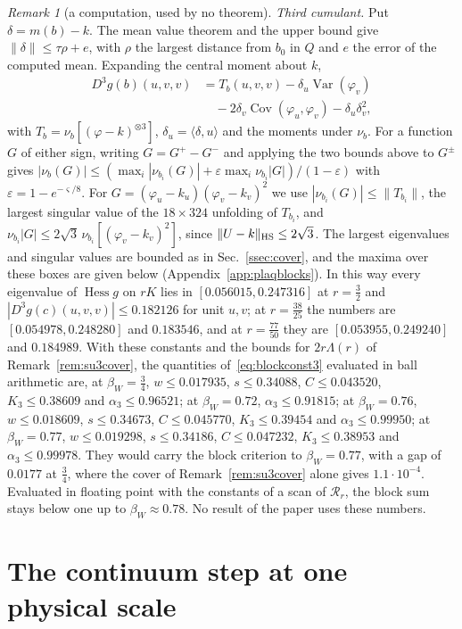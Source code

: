 \documentclass[aps,prd,twocolumn,superscriptaddress,nofootinbib,longbibliography,floatfix,amsmath,amssymb,10pt]{revtex4-2}
\theoremstyle{definition}
\theoremstyle{remark}
\newtheorem{remark}[theorem]{Remark}
\newcommand{\Hess}{\operatorname{Hess}}
\newcommand{\Cov}{\operatorname{Cov}}
\newcommand{\Var}{\operatorname{Var}}
\newcommand{\ip}[2]{\langle #1,#2\rangle}
\begin{document}
\begin{remark}[a computation, used by no theorem]
\emph{Third cumulant.} Put $\delta=m(b)-k$. The mean value theorem and the
upper bound give $\|\delta\|\le\tau\rho+e$, with $\rho$ the largest distance
from $b_0$ in $Q$ and $e$ the error of the computed mean. Expanding the
central moment about $k$,
\[
\begin{aligned}
D^3g(b)(u,v,v)&=T_b(u,v,v)-\delta_u\Var(\varphi_v)\\
&\quad-2\delta_v\Cov(\varphi_u,\varphi_v)-\delta_u\delta_v^2 ,
\end{aligned}
\]
with $T_b=\nu_b[(\varphi-k)^{\otimes3}]$, $\delta_u=\ip\delta u$ and the
moments under $\nu_b$. For a function $G$ of either sign, writing $G=G^+-G^-$
and applying the two bounds above to $G^\pm$ gives
$|\nu_b(G)|\le(\max_i|\nu_{b_i}(G)|+\varepsilon\max_i\nu_{b_i}|G|)/(1-
\varepsilon)$ with $\varepsilon=1-e^{-\varsigma/8}$. For $G=(\varphi_u-k_u)
(\varphi_v-k_v)^2$ we use $|\nu_{b_i}(G)|\le\|T_{b_i}\|$, the largest singular
value of the $18\times324$ unfolding of $T_{b_i}$, and $\nu_{b_i}|G|\le2\sqrt3
\,\nu_{b_i}[(\varphi_v-k_v)^2]$, since $\|U-k\|_{\rm HS}\le2\sqrt3$. The
largest eigenvalues and singular values are bounded as in
Sec.~\ref{ssec:cover}, and the maxima over these boxes are given below
(Appendix~\ref{app:plaqblocks}).
In this way every eigenvalue of $\Hess g$ on $rK$ lies in $[0.056015,
0.247316]$ at $r=\frac32$ and $|D^3g(c)(u,v,v)|\le0.182126$ for unit
$u,v$; at $r=\frac{38}{25}$ the numbers are $[0.054978,0.248280]$ and
$0.183546$, and at $r=\frac{77}{50}$ they are $[0.053955,0.249240]$ and
$0.184989$. With these constants and the bounds for $2r\Lambda(r)$ of
Remark~\ref{rem:su3cover}, the quantities of~\eqref{eq:blockconst3}
evaluated in ball arithmetic are, at $\beta_W=\frac34$, $w\le0.017935$,
$s\le0.34088$, $C\le0.043520$, $K_3\le0.38609$ and $\alpha_3\le0.96521$;
at $\beta_W=0.72$, $\alpha_3\le0.91815$; at $\beta_W=0.76$, $w\le0.018609$,
$s\le0.34673$, $C\le0.045770$, $K_3\le0.39454$ and $\alpha_3\le0.99950$; at
$\beta_W=0.77$, $w\le0.019298$, $s\le0.34186$, $C\le0.047232$, $K_3\le
0.38953$ and $\alpha_3\le0.99978$. They would carry the block criterion to
$\beta_W=0.77$, with a gap of $0.0177$ at $\frac34$, where the cover of
Remark~\ref{rem:su3cover} alone gives $1.1\cdot10^{-4}$. Evaluated in
floating point with the constants of a scan of $\mathcal R_r$, the block
sum stays below one up to $\beta_W\approx0.78$. No result of the paper uses
these numbers.
\end{remark}

\section{The continuum step at one physical scale}\label{sec:bypass}
\end{document}
